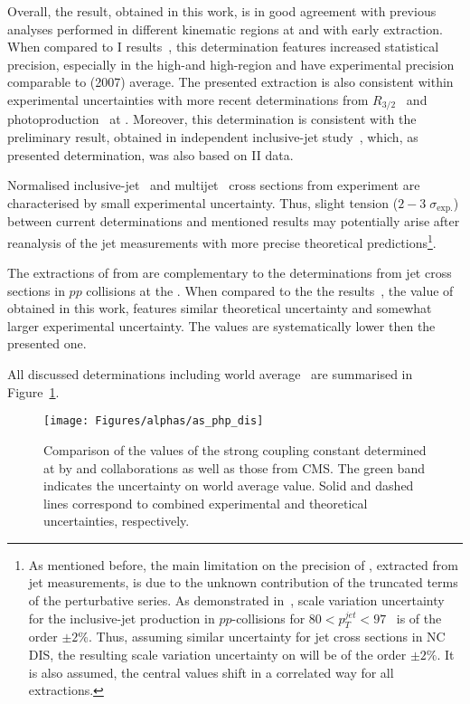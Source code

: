 Overall, the result, obtained in this work, is in good agreement with previous analyses performed in different kinematic regions at \zeus and with early \hone extraction. When compared to \hera I results~\cite{pl:b649:12,Aktas:2007aa,pl:b560:7}, this determination features increased statistical precision, especially in the high-\etjetb and high-\qsq region and have experimental precision comparable to \hera (2007) average. The presented extraction is also consistent within experimental uncertainties with more recent determinations from $R_{3/2}$~\cite{thesis:behr:2010} and photoproduction~\cite{np:b864:1} at \zeus. Moreover, this \asz determination is consistent with the preliminary result, obtained in independent inclusive-jet study~\cite{upub:zp10002}, which, as presented determination, was also based on \hera II data. %

Normalised inclusive-jet~\cite{epj:c65:363} and multijet~\cite{epj:c75:65} cross sections from \hone experiment are characterised by small experimental uncertainty. Thus, slight tension ($2-3\;\sigma_\text{exp.}$) between current determinations and mentioned \hone results may potentially arise after reanalysis of the jet measurements with more precise theoretical predictions\footnote{As mentioned before, the main limitation on the precision of \asz, extracted from jet measurements, is due to the unknown contribution of the truncated terms of the perturbative series. As demonstrated in~\cite{Currie:2013dwa}, scale variation uncertainty for the inclusive-jet production in $pp$-collisions for $80<p_T^{jet}<97$ \GeV~is of the order $\pm2\%$. Thus, assuming similar uncertainty for jet cross sections in NC DIS, the resulting scale variation uncertainty on \asz will be of the order $\pm2\%$. It is also assumed, the central \asz values shift in a correlated way for all extractions.}.

The extractions of \asz from \hera are complementary to the determinations from jet cross sections in $pp$ collisions at the \lhc. When compared to the the \cms results~\cite{Chatrchyan:2012bja,Chatrchyan:2013txa,CMS:2014mna}, the value of \asz obtained in this work, features similar theoretical uncertainty and somewhat larger experimental uncertainty. The \cms values are systematically lower then the presented one.

All discussed determinations including world average~\cite{PDG:2014} are summarised in Figure~\ref{fig:as_php_dis}.
\begin{figure}[htpb]
	\centering
		\texttt{[image: Figures/alphas/as\_php\_dis]}
	\caption{Comparison of the values of the strong coupling constant determined at \hera by \hone and \zeus collaborations as well as those from CMS. The green band indicates the uncertainty on world average \as value. Solid and dashed lines correspond to combined experimental and theoretical uncertainties, respectively.}
	\label{fig:as_php_dis}
\end{figure}
